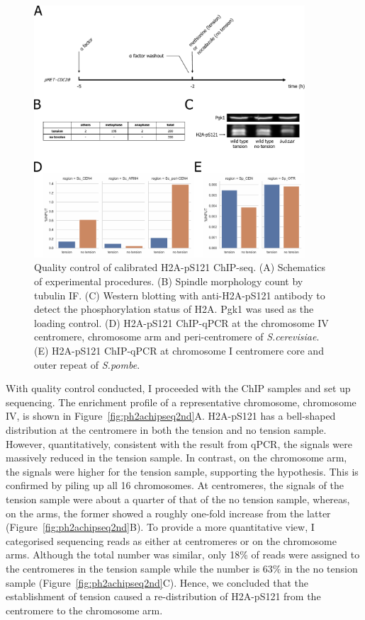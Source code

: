 \begin{figure}[htbp]
  \centering
  \includegraphics[width=0.9\textwidth]{chapter3/figures/checking.pdf}
  \caption[Quality control of calibrated H2A-pS121 ChIP-seq]{Quality control of calibrated H2A-pS121 ChIP-seq. (A) Schematics of experimental procedures. (B) Spindle morphology count by tubulin IF. (C) Western blotting with anti-H2A-pS121 antibody to detect the phosphorylation status of H2A. Pgk1 was used as the loading control. (D) H2A-pS121 ChIP-qPCR at the chromosome IV centromere, chromosome arm and peri-centromere of \textit{S.cerevisiae}. (E) H2A-pS121 ChIP-qPCR at chromosome I centromere core and outer repeat of \textit{S.pombe}. }
  \label{fig:ph2achipseqchecking}
\end{figure}

With quality control conducted, I proceeded with the ChIP samples and set up sequencing. The enrichment profile of a representative chromosome, chromosome IV, is shown in Figure~\ref{fig:ph2achipseq2nd}A. H2A-pS121 has a bell-shaped distribution at the centromere in both the tension and no tension sample. However, quantitatively, consistent with the result from qPCR, the signals were massively reduced in the tension sample. In contrast, on the chromosome arm, the signals were higher for the tension sample, supporting the hypothesis. This is confirmed by piling up all 16 chromosomes. At centromeres, the signals of the tension sample were about a quarter of that of the no tension sample, whereas, on the arms, the former showed a roughly one-fold increase from the latter (Figure~\ref{fig:ph2achipseq2nd}B). To provide a more quantitative view, I categorised sequencing reads as either at centromeres or on the chromosome arms. Although the total number was similar, only 18\% of reads were assigned to the centromeres in the tension sample while the number is 63\% in the no tension sample (Figure~\ref{fig:ph2achipseq2nd}C). Hence, we concluded that the establishment of tension caused a re-distribution of H2A-pS121 from the centromere to the chromosome arm. 

